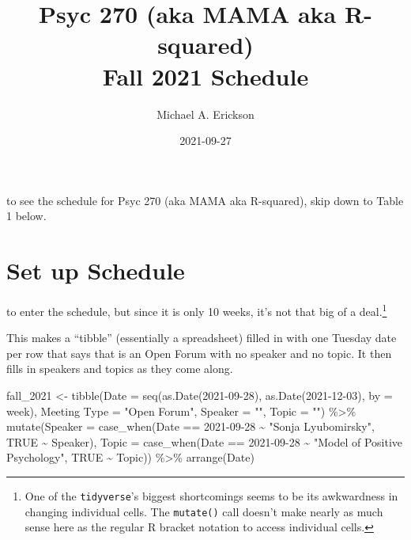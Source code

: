 \documentclass[]{tufte-handout}
\title{Psyc 270 (aka MAMA aka R-squared)\\
Fall 2021 Schedule}
\author{Michael A. Erickson}
\date{2021-09-27}
\newenvironment{Shaded}{}{}
\newcommand{\AttributeTok}[1]{\textcolor[rgb]{0.49,0.56,0.16}{#1}}
\newcommand{\ConstantTok}[1]{\textcolor[rgb]{0.53,0.00,0.00}{#1}}
\newcommand{\FunctionTok}[1]{\textcolor[rgb]{0.02,0.16,0.49}{#1}}
\newcommand{\NormalTok}[1]{#1}
\newcommand{\OtherTok}[1]{\textcolor[rgb]{0.00,0.44,0.13}{#1}}
\newcommand{\SpecialCharTok}[1]{\textcolor[rgb]{0.25,0.44,0.63}{#1}}
\newcommand{\StringTok}[1]{\textcolor[rgb]{0.25,0.44,0.63}{#1}}
\begin{document}
\maketitle




 to see the schedule for Psyc 270 (aka MAMA
aka R-squared), skip down to Table 1 below.

\hypertarget{set-up-schedule}{%
\section{Set up Schedule}\label{set-up-schedule}}

 to enter the schedule, but since it
is only 10 weeks, it's not that big of a deal.\footnote{One of the
  \texttt{tidyverse}'s biggest shortcomings seems to be its awkwardness
  in changing individual cells. The \texttt{mutate()} call doesn't make
  nearly as much sense here as the regular R bracket notation to access
  individual cells.}

This makes a ``tibble'' (essentially a spreadsheet) filled in with one
Tuesday date per row that says that is an Open Forum with no speaker and
no topic. It then fills in speakers and topics as they come along.

\begin{Shaded}
\begin{Highlighting}[]
\NormalTok{fall\_2021 }\OtherTok{\textless{}{-}} 
  \FunctionTok{tibble}\NormalTok{(}\AttributeTok{Date =} \FunctionTok{seq}\NormalTok{(}\FunctionTok{as.Date}\NormalTok{(}\StringTok{\textquotesingle{}2021{-}09{-}28\textquotesingle{}}\NormalTok{),}
                    \FunctionTok{as.Date}\NormalTok{(}\StringTok{\textquotesingle{}2021{-}12{-}03\textquotesingle{}}\NormalTok{),}
                    \AttributeTok{by =} \StringTok{\textquotesingle{}week\textquotesingle{}}\NormalTok{),}
         \StringTok{\textasciigrave{}}\AttributeTok{Meeting Type}\StringTok{\textasciigrave{}} \OtherTok{=} \StringTok{"Open Forum"}\NormalTok{, }
         \AttributeTok{Speaker =} \StringTok{""}\NormalTok{, }\AttributeTok{Topic =} \StringTok{""}\NormalTok{) }\SpecialCharTok{\%\textgreater{}\%}
  \FunctionTok{mutate}\NormalTok{(}\AttributeTok{Speaker =} \FunctionTok{case\_when}\NormalTok{(Date }\SpecialCharTok{==} \StringTok{\textquotesingle{}2021{-}09{-}28\textquotesingle{}} \SpecialCharTok{\textasciitilde{}} \StringTok{"Sonja Lyubomirsky"}\NormalTok{,}
                              \ConstantTok{TRUE} \SpecialCharTok{\textasciitilde{}}\NormalTok{ Speaker),}
         \AttributeTok{Topic =} \FunctionTok{case\_when}\NormalTok{(Date }\SpecialCharTok{==} \StringTok{\textquotesingle{}2021{-}09{-}28\textquotesingle{}} \SpecialCharTok{\textasciitilde{}} \StringTok{"Model of Positive Psychology"}\NormalTok{,}
                              \ConstantTok{TRUE} \SpecialCharTok{\textasciitilde{}}\NormalTok{ Topic)) }\SpecialCharTok{\%\textgreater{}\%}
  \FunctionTok{arrange}\NormalTok{(Date)}
\end{Highlighting}
\end{Shaded}
\end{document}
